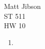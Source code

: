 \documentclass{article}
\begin{document}
\begin{flushright}
Matt Jibson \\
ST 511 \\
HW 10
\end{flushright}

\begin{enumerate}
	\item
\end{enumerate}
\end{document}
